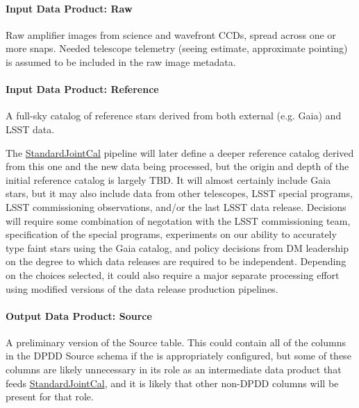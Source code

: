 \paragraph{Input Data Product: Raw}
\label{sec:drpBootstrapImChar_raw}

Raw amplifier images from science and wavefront CCDs, spread across one or more snaps.  Needed telescope telemetry (seeing estimate, approximate pointing) is assumed to be included in the raw image metadata.

\paragraph{Input Data Product: Reference}
\label{sec:drpBootstrapImChar_reference}

A full-sky catalog of reference stars derived from both external (e.g. Gaia) and LSST data.

The \hyperref[sec:drpStandardJointCal]{StandardJointCal} pipeline will later define a deeper reference catalog derived from this one and the new data being processed, but the origin and depth of the initial reference catalog is largely TBD.  It will almost certainly include Gaia stars, but it may also include data from other telescopes, LSST special programs, LSST commissioning observations, and/or the last LSST data release.  Decisions will require some combination of negotation with the LSST commissioning team, specification of the special programs, experiments on our ability to accurately type faint stars using the Gaia catalog, and policy decisions from DM leadership on the degree to which data releases are required to be independent.  Depending on the choices selected, it could also require a major separate processing effort using modified versions of the data release production pipelines.

\paragraph{Output Data Product: Source}
\label{sec:drpBootstrapImChar_sources}

A preliminary version of the Source table.  This could contain all of the columns in the DPDD Source schema if the  is appropriately configured, but some of these columns are likely unnecessary in its role as an intermediate data product that feeds \hyperref[sec:drpStandardJointCal]{StandardJointCal}, and it is likely that other non-DPDD columns will be present for that role.

